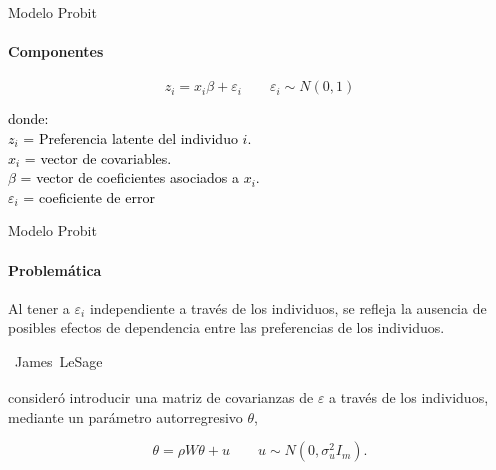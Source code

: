 \setwatermark{\fontsize{90pt}{90pt}\selectfont{\textcolor{indigo(web)}{Probit}}}
\begin{frame}{Modelo Probit}
\framesubtitle{Componentes}

\[ z_i = x_i\beta + \varepsilon_i \qquad  \varepsilon_i \sim N(0,1) \]

\textcolor{black}{
donde:\\
$z_i$ = Preferencia latente del individuo $i$.\\
$x_i$ = vector de covariables.\\
$\beta$ = vector de coeficientes asociados a $x_i$.\\
$\varepsilon_i$ = coeficiente de error}


\end{frame}

\setwatermark{\fontsize{40pt}{40pt}\selectfont{ }}
\begin{frame}{Modelo Probit}
\framesubtitle{Problemática}

Al tener a $\varepsilon_i$ \alert{independiente} a través de los individuos, se refleja la \alert{ausencia de posibles efectos de dependencia} entre las preferencias de los individuos.

\vspace*{1.0 cm}
 \hbox{%
\fontsize{40}{48}\selectfont
\textcolor{mint}{James LeSage\textsubscript{\cite{lesage2000}}}
 }\vbox{%
 \fontsize{8}{8}\selectfont
\textcolor{mint}{\cite{lesage2000}}}

consideró introducir una matriz de covarianzas de $\varepsilon$ a través de los individuos, mediante un parámetro \alert{autorregresivo} $\theta$,

\[ \theta = \rho W\theta + u \qquad  u \sim N(0,\sigma_{u}^2 I_m). \]

\end{frame}

